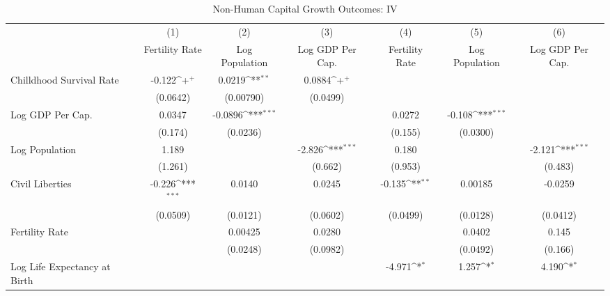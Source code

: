 \begin{table}[htbp]\centering
\def\sym#1{\ifmmode^{#1}\else\(^{#1}\)\fi}
\caption{Non-Human Capital Growth Outcomes: IV}
\begin{tabular}{l*{6}{c}}
\toprule
                &\multicolumn{1}{c}{(1)}&\multicolumn{1}{c}{(2)}&\multicolumn{1}{c}{(3)}&\multicolumn{1}{c}{(4)}&\multicolumn{1}{c}{(5)}&\multicolumn{1}{c}{(6)}\\
                &\multicolumn{1}{c}{Fertility Rate}&\multicolumn{1}{c}{Log Population}&\multicolumn{1}{c}{Log GDP Per Cap.}&\multicolumn{1}{c}{Fertility Rate}&\multicolumn{1}{c}{Log Population}&\multicolumn{1}{c}{Log GDP Per Cap.}\\
\midrule
Chilldhood Survival Rate&   -0.122\sym{+}  &   0.0219\sym{**} &   0.0884\sym{+}  &                  &                  &                  \\
                & (0.0642)         &(0.00790)         & (0.0499)         &                  &                  &                  \\
\addlinespace
Log GDP Per Cap.&   0.0347         &  -0.0896\sym{***}&                  &   0.0272         &   -0.108\sym{***}&                  \\
                &  (0.174)         & (0.0236)         &                  &  (0.155)         & (0.0300)         &                  \\
\addlinespace
Log Population  &    1.189         &                  &   -2.826\sym{***}&    0.180         &                  &   -2.121\sym{***}\\
                &  (1.261)         &                  &  (0.662)         &  (0.953)         &                  &  (0.483)         \\
\addlinespace
Civil Liberties &   -0.226\sym{***}&   0.0140         &   0.0245         &   -0.135\sym{**} &  0.00185         &  -0.0259         \\
                & (0.0509)         & (0.0121)         & (0.0602)         & (0.0499)         & (0.0128)         & (0.0412)         \\
\addlinespace
Fertility Rate  &                  &  0.00425         &   0.0280         &                  &   0.0402         &    0.145         \\
                &                  & (0.0248)         & (0.0982)         &                  & (0.0492)         &  (0.166)         \\
\addlinespace
Log Life Expectancy at Birth&                  &                  &                  &   -4.971\sym{*}  &    1.257\sym{*}  &    4.190\sym{*}  \\

\end{tabular}
\end{table}
